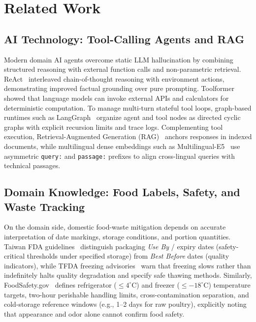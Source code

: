 \documentclass[conference]{IEEEtran}
\begin{document}
\section{Related Work}

\subsection{AI Technology: Tool-Calling Agents and RAG}
Modern domain AI agents overcome static LLM hallucination by combining structured reasoning with external function calls and non-parametric retrieval. ReAct~\cite{yao2023react} interleaved chain-of-thought reasoning with environment actions, demonstrating improved factual grounding over pure prompting. Toolformer~\cite{schick2023toolformer} showed that language models can invoke external APIs and calculators for deterministic computation. To manage multi-turn stateful tool loops, graph-based runtimes such as LangGraph~\cite{langgraph} organize agent and tool nodes as directed cyclic graphs with explicit recursion limits and trace logs. Complementing tool execution, Retrieval-Augmented Generation (RAG)~\cite{lewis2020rag} anchors responses in indexed documents, while multilingual dense embeddings such as Multilingual-E5~\cite{wang2024e5} use asymmetric \texttt{query:} and \texttt{passage:} prefixes to align cross-lingual queries with technical passages.

\subsection{Domain Knowledge: Food Labels, Safety, and Waste Tracking}
On the domain side, domestic food-waste mitigation depends on accurate interpretation of date markings, storage conditions, and portion quantities. Taiwan FDA guidelines~\cite{tfda_date} distinguish packaging \emph{Use By} / expiry dates (safety-critical thresholds under specified storage) from \emph{Best Before} dates (quality indicators), while TFDA freezing advisories~\cite{tfda_freeze} warn that freezing slows rather than indefinitely halts quality degradation and specify safe thawing methods. Similarly, FoodSafety.gov~\cite{foodsafety_4steps,foodsafety_charts} defines refrigerator ($\le 4^\circ\text{C}$) and freezer ($\le -18^\circ\text{C}$) temperature targets, two-hour perishable handling limits, cross-contamination separation, and cold-storage reference windows (e.g., 1--2 days for raw poultry), explicitly noting that appearance and odor alone cannot confirm food safety.
\end{document}
